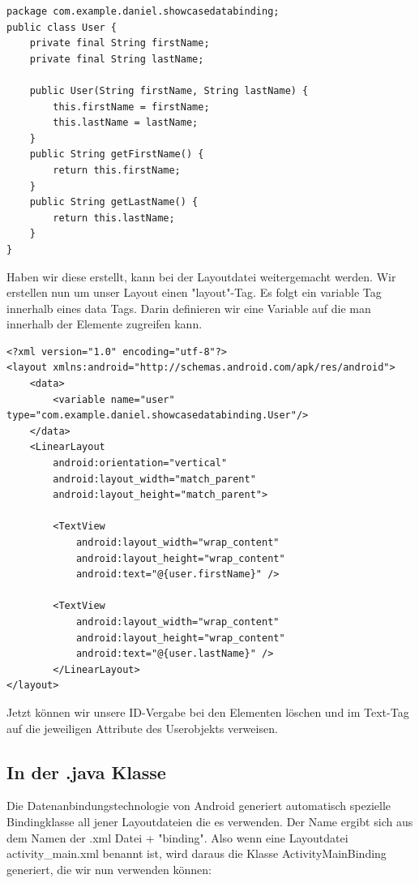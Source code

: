 \documentclass[a4paper,12pt]{article}
\begin{document}
\begin{lstlisting}[caption={Unsere Objektklasse die bei der Datenanbindung referenziert wird.},label=DescriptiveLabel]
package com.example.daniel.showcasedatabinding;
public class User {
    private final String firstName;
    private final String lastName;

    public User(String firstName, String lastName) {
        this.firstName = firstName;
        this.lastName = lastName;
    }
    public String getFirstName() {
        return this.firstName;
    }
    public String getLastName() {
        return this.lastName;
    }
}
\end{lstlisting}

Haben wir diese erstellt, kann bei der Layoutdatei weitergemacht werden. Wir erstellen nun um unser Layout einen "layout"-Tag. Es folgt ein variable Tag innerhalb eines data Tags. Darin definieren wir eine Variable auf die man innerhalb der Elemente zugreifen kann.

\begin{lstlisting}[caption={Die XML Datei nach der Integration einer Datenanbindung.},label=DescriptiveLabel]
<?xml version="1.0" encoding="utf-8"?>
<layout xmlns:android="http://schemas.android.com/apk/res/android">
    <data>
	    <variable name="user" type="com.example.daniel.showcasedatabinding.User"/>
    </data>
    <LinearLayout
	    android:orientation="vertical"
	    android:layout_width="match_parent"
	    android:layout_height="match_parent">
    
	    <TextView
	        android:layout_width="wrap_content"
	        android:layout_height="wrap_content"
	        android:text="@{user.firstName}" />
		    
	    <TextView
	        android:layout_width="wrap_content"
	        android:layout_height="wrap_content"
	        android:text="@{user.lastName}" />
	    </LinearLayout>
</layout>
\end{lstlisting}


Jetzt können wir unsere ID-Vergabe bei den Elementen löschen und im Text-Tag auf die jeweiligen Attribute des Userobjekts verweisen.

\newpage
\subsection{In der .java Klasse}
Die Datenanbindungstechnologie von Android generiert automatisch spezielle Bindingklasse all jener Layoutdateien die es verwenden. Der Name ergibt sich aus dem Namen der .xml Datei + "binding". Also wenn eine Layoutdatei activity\_main.xml benannt ist, wird daraus die Klasse ActivityMainBinding generiert, die wir nun verwenden können:
\end{document}
